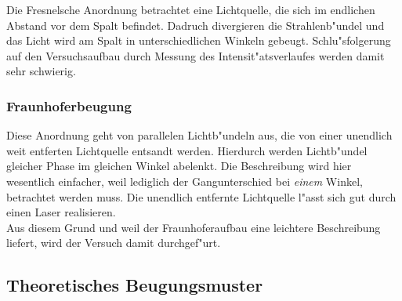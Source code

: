 			Die Fresnelsche Anordnung betrachtet eine Lichtquelle, die sich im endlichen Abstand vor dem Spalt befindet.
			Dadruch divergieren die Strahlenb"undel und das Licht wird am Spalt in unterschiedlichen Winkeln gebeugt.
			Schlu"sfolgerung auf den Versuchsaufbau durch Messung des Intensit"atsverlaufes werden damit sehr schwierig.

		\subsubsection{Fraunhoferbeugung}
			\label{subsubsec:fraunhofer}

			Diese Anordnung geht von parallelen Lichtb"undeln aus, die von einer unendlich weit entferten Lichtquelle entsandt werden.
			Hierdurch werden Lichtb"undel gleicher Phase im gleichen Winkel abelenkt.
			Die Beschreibung wird hier wesentlich einfacher, weil lediglich der Gangunterschied bei \emph{einem} Winkel, betrachtet werden muss.
			Die unendlich entfernte Lichtquelle l"asst sich gut durch einen Laser realisieren.\\

			Aus diesem Grund und weil der Fraunhoferaufbau eine leichtere Beschreibung liefert, wird der Versuch damit durchgef"urt.

	\subsection{Theoretisches Beugungsmuster}